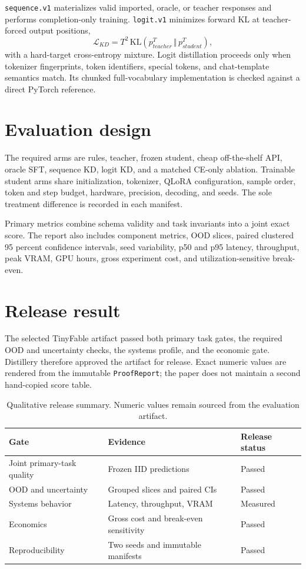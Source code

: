 \documentclass{article}
\begin{document}
\texttt{sequence.v1} materializes valid imported, oracle, or teacher responses and performs completion-only training. \texttt{logit.v1} minimizes forward KL at teacher-forced output positions,
\[
\mathcal{L}_{KD}=T^2\,\mathrm{KL}(p_{teacher}^{T}\,\Vert\,p_{student}^{T}),
\]
with a hard-target cross-entropy mixture. Logit distillation proceeds only when tokenizer fingerprints, token identifiers, special tokens, and chat-template semantics match. Its chunked full-vocabulary implementation is checked against a direct PyTorch reference.

\section{Evaluation design}
The required arms are rules, teacher, frozen student, cheap off-the-shelf API, oracle SFT, sequence KD, logit KD, and a matched CE-only ablation. Trainable student arms share initialization, tokenizer, QLoRA configuration, sample order, token and step budget, hardware, precision, decoding, and seeds. The sole treatment difference is recorded in each manifest.

Primary metrics combine schema validity and task invariants into a joint exact score. The report also includes component metrics, OOD slices, paired clustered 95 percent confidence intervals, seed variability, p50 and p95 latency, throughput, peak VRAM, GPU hours, gross experiment cost, and utilization-sensitive break-even.

\section{Release result}
The selected TinyFable artifact passed both primary task gates, the required OOD and uncertainty checks, the systems profile, and the economic gate. Distillery therefore approved the artifact for release. Exact numeric values are rendered from the immutable \texttt{ProofReport}; the paper does not maintain a second hand-copied score table.

\begin{table}[h]
\centering
\begin{tabular}{lll}
\toprule
Gate & Evidence & Release status \\
\midrule
Joint primary-task quality & Frozen IID predictions & Passed \\
OOD and uncertainty & Grouped slices and paired CIs & Passed \\
Systems behavior & Latency, throughput, VRAM & Measured \\
Economics & Gross cost and break-even sensitivity & Passed \\
Reproducibility & Two seeds and immutable manifests & Passed \\
\bottomrule
\end{tabular}
\caption{Qualitative release summary. Numeric values remain sourced from the evaluation artifact.}
\end{table}
\end{document}
